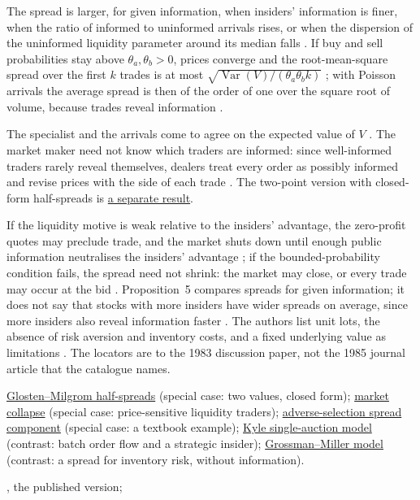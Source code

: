 \begin{qfmodel}
 The spread is larger, for given information, when insiders' information is finer, when the ratio of informed to uninformed arrivals rises, or when the dispersion of the uninformed liquidity parameter around its median falls \citep[Prop.~5, pp.~15--16]{glosten-milgrom-1983}. If buy and sell probabilities stay above $\theta_a,\theta_b>0$, prices converge and the root-mean-square spread over the first $k$ trades is at most $\sqrt{\operatorname{Var}(V)/(\theta_a\theta_b k)}$ \citep[Prop.~3, p.~11]{glosten-milgrom-1983}; with Poisson arrivals the average spread is then of the order of one over the square root of volume, because trades reveal information \citep[pp.~18--19]{glosten-milgrom-1983}.

The specialist and the arrivals come to agree on the expected value of $V$ \citep[Prop.~4, p.~13]{glosten-milgrom-1983}. The market maker need not know which traders are informed: since well-informed traders rarely reveal themselves, dealers treat every order as possibly informed and revise prices with the side of each trade \citep[chap.~``Dealers'', pp.~288--289]{alpha-harris}. The two-point version with closed-form half-spreads is \hyperref[res:glosten-milgrom-half-spreads]{a separate result}.

 If the liquidity motive is weak relative to the insiders' advantage, the zero-profit quotes may preclude trade, and the market shuts down until enough public information neutralises the insiders' advantage \citep[p.~9]{glosten-milgrom-1983}; if the bounded-probability condition fails, the spread need not shrink: the market may close, or every trade may occur at the bid \citep[p.~12]{glosten-milgrom-1983}. Proposition~5 compares spreads for given information; it does not say that stocks with more insiders have wider spreads on average, since more insiders also reveal information faster \citep[p.~17]{glosten-milgrom-1983}. The authors list unit lots, the absence of risk aversion and inventory costs, and a fixed underlying value as limitations \citep[sec.~IV, pp.~24--25]{glosten-milgrom-1983}. The locators are to the 1983 discussion paper, not the 1985 journal article that the catalogue names.

 \hyperref[res:glosten-milgrom-half-spreads]{Glosten--Milgrom half-spreads} (special case: two values, closed form); \hyperref[res:glosten-milgrom-market-collapse]{market collapse} (special case: price-sensitive liquidity traders); \hyperref[res:adverse-selection-spread-component]{adverse-selection spread component} (special case: a textbook example); \hyperref[mod:kyle-single-auction]{Kyle single-auction model} (contrast: batch order flow and a strategic insider); \hyperref[mod:grossman-miller]{Grossman--Miller model} (contrast: a spread for inventory risk, without information).

 \citep{s6-glosten}, the published version;

\end{qfmodel}

